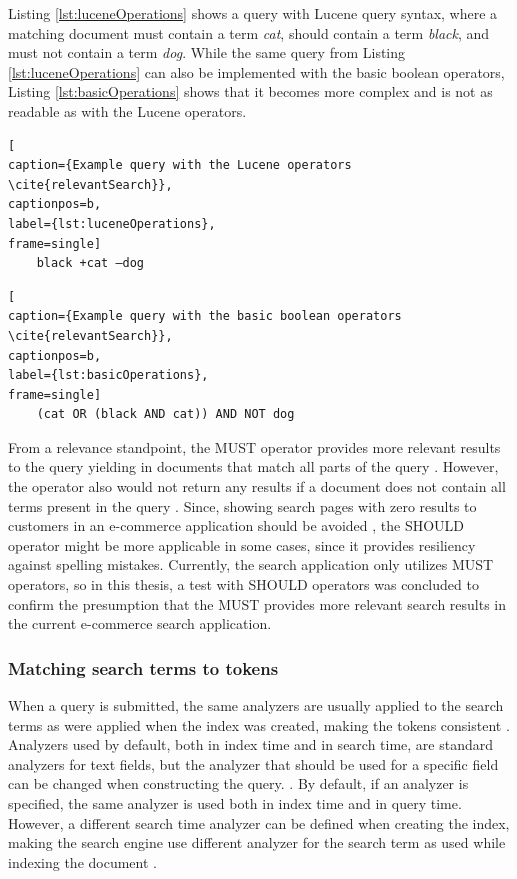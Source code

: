 Listing \ref{lst:luceneOperations} shows a query with Lucene query syntax, where a matching document must contain a term \emph{cat},
should contain a term \emph{black}, and must not contain a term \emph{dog}.
While the same query from Listing \ref{lst:luceneOperations} can also be implemented with the basic boolean operators,
Listing \ref{lst:basicOperations} shows that it becomes more complex and is not as readable as with the Lucene operators.
\cite{relevantSearch}
\begin{lstlisting}[
caption={Example query with the Lucene operators \cite{relevantSearch}},
captionpos=b,
label={lst:luceneOperations},
frame=single]
    black +cat –dog
\end{lstlisting}
\begin{lstlisting}[
caption={Example query with the basic boolean operators \cite{relevantSearch}},
captionpos=b,
label={lst:basicOperations},
frame=single]
    (cat OR (black AND cat)) AND NOT dog
\end{lstlisting}


From a relevance standpoint, the MUST operator provides more relevant results to the query 
yielding in documents that match all parts of the query \cite{relevantSearch}.
However, the operator also would not return any results if a document does not contain all terms present in the query \cite{relevantSearch}.
Since, showing search pages with zero results to customers in an e-commerce application should be avoided \cite{zeroResults},
the SHOULD operator might be more applicable in some cases, since it provides resiliency against spelling mistakes.
Currently, the search application only utilizes MUST operators, so in this thesis, a test with SHOULD operators was concluded
to confirm the presumption that the MUST provides more relevant search results in the current e-commerce search application.



\subsubsection{Matching search terms to tokens}

When a query is submitted, the same analyzers are usually applied to the search terms as were applied 
when the index was created, making the tokens consistent
\cite{relevantSearch}.
Analyzers used by default, both in index time and in search time, are standard analyzers for text fields,
but the analyzer that should be used for a specific field can be changed when constructing the query.
\cite{elasticIntro}.
By default, if an analyzer is specified, the same analyzer is used both in index time and in query time.
However, a different search time analyzer can be defined when creating the index, making the search engine
use different analyzer for the search term as used while indexing the document \cite{relevantSearch}.


